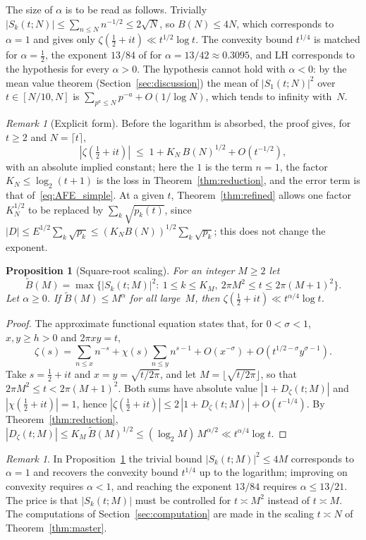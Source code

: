 \documentclass[11pt]{amsart}
\newtheorem{proposition}[theorem]{Proposition}
\theoremstyle{definition}
\theoremstyle{remark}
\newtheorem{remark}[theorem]{Remark}
\newcommand{\half}{\tfrac{1}{2}}
\begin{document}
The size of $\alpha$ is to be read as follows.  Trivially
$|S_k(t;N)|\le\sum_{n\le N}n^{-1/2}\le2\sqrt N$, so $B(N)\le 4N$, which
corresponds to $\alpha=1$ and gives only $\zeta(\half+it)\ll t^{1/2}\log t$.
The convexity bound $t^{1/4}$ is matched for $\alpha=\half$, the exponent
$13/84$ of \cite{bourgain2017} for $\alpha=13/42\approx0.3095$, and LH
corresponds to the hypothesis for every $\alpha>0$.  The hypothesis
cannot hold with $\alpha<0$: by the mean value theorem
(Section~\ref{sec:discussion}) the mean of $|S_1(t;N)|^2$ over
$t\in[N/10,N]$ is $\sum_{p^a\le N}p^{-a}+O(1/\log N)$, which tends to
infinity with~$N$.

\begin{remark}[Explicit form]\label{rem:effective}
Before the logarithm is absorbed, the proof gives, for $t\ge2$ and
$N=\lceil t\rceil$,
\[
  |\zeta(\half+it)|
  \;\le\; 1+K_N\,B(N)^{1/2}+O(t^{-1/2}),
\]
with an absolute implied constant; here the $1$ is the term $n=1$, the
factor $K_N\le\log_2(t+1)$ is the loss in Theorem~\ref{thm:reduction}, and
the error term is that of~\eqref{eq:AFE_simple}.  At a given $t$,
Theorem~\ref{thm:refined} allows one factor $K_N^{1/2}$ to be replaced by
$\sum_k\sqrt{p_k(t)}$, since
$|D|\le E^{1/2}\sum_k\sqrt{p_k}\le (K_NB(N))^{1/2}\sum_k\sqrt{p_k}$; this
does not change the exponent.
\end{remark}

\begin{proposition}[Square-root scaling]\label{prop:sqrt_scaling}
For an integer $M\ge2$ let
\[
  \widetilde B(M)=\max\bigl\{|S_k(t;M)|^2:\ 1\le k\le K_M,\
  2\pi M^2\le t\le2\pi(M+1)^2\bigr\}.
\]
Let $\alpha\ge0$. If $\widetilde B(M)\le M^\alpha$ for all large~$M$, then
$\zeta(\half+it)\ll t^{\alpha/4}\log t$.
\end{proposition}
\begin{proof}
The approximate functional equation
\cite[Theorem~4.13]{titchmarsh1986} states that, for $0<\sigma<1$, $x,y\ge h>0$ and $2\pi xy=t$,
\[
  \zeta(s)=\sum_{n\le x}n^{-s}+\chi(s)\sum_{n\le y}n^{s-1}
  +O(x^{-\sigma})+O(t^{1/2-\sigma}y^{\sigma-1}).
\]
Take $s=\half+it$ and $x=y=\sqrt{t/2\pi}$, and let
$M=\lfloor\sqrt{t/2\pi}\rfloor$, so that
$2\pi M^2\le t<2\pi(M+1)^2$.  Both sums have absolute value
$|1+D_\zeta(t;M)|$ and $|\chi(\half+it)|=1$, hence
$|\zeta(\half+it)|\le 2\,|1+D_\zeta(t;M)| + O(t^{-1/4})$.
By Theorem~\ref{thm:reduction},
$|D_\zeta(t;M)|\le K_M\,\widetilde B(M)^{1/2}\le(\log_2 M)\,M^{\alpha/2}
\ll t^{\alpha/4}\log t$.
\end{proof}
\begin{remark}
In Proposition~\ref{prop:sqrt_scaling} the trivial bound
$|S_k(t;M)|^2\le4M$ corresponds to $\alpha=1$ and recovers the convexity
bound $t^{1/4}$ up to the logarithm; improving on convexity requires
$\alpha<1$, and reaching the exponent $13/84$ requires $\alpha\le13/21$.
The price is that $|S_k(t;M)|$ must be controlled for $t\asymp M^2$
instead of $t\asymp M$.  The computations of
Section~\ref{sec:computation} are made in the scaling $t\asymp N$ of
Theorem~\ref{thm:master}.
\end{remark}
\end{document}
